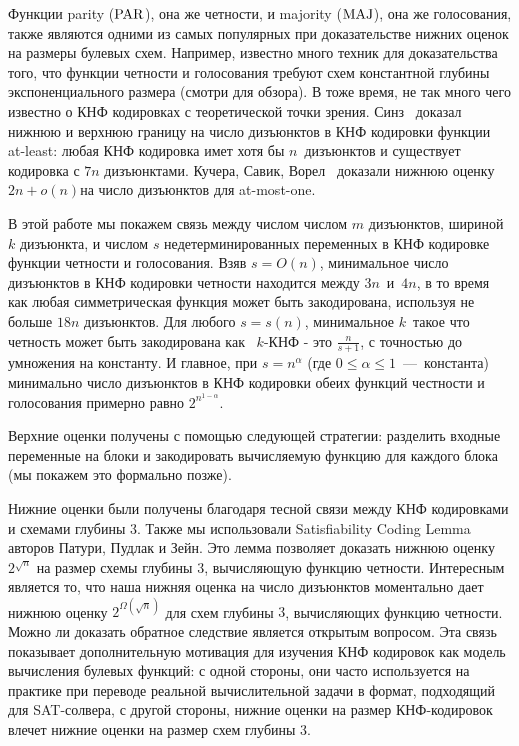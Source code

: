 Функции parity ($\operatorname{PAR}$), она же четности, и majority ($\operatorname{MAJ}$), она же голосования, также являются одними из самых популярных при доказательстве нижних оценок на размеры булевых схем. Например, известно много техник для доказательства того, что функции четности и голосования требуют схем константной глубины экспоненциального размера (смотри \cite[главы~11 и~12]{DBLP:books/daglib/0028687} для обзора). В тоже время, не так много чего известно о КНФ кодировках с теоретической точки зрения. Синз~\cite{DBLP:conf/cp/Sinz05} доказал нижнюю и верхнюю границу на число дизъюнктов в КНФ кодировки функции at-least:
любая КНФ кодировка имет хотя бы $n$~дизъюнктов и существует кодировка с $7n$ дизъюнктами.
Кучера, Савик, Ворел~\cite{DBLP:journals/tcs/KuceraSV19} 
доказали нижнюю оценку $2n + o(n)$на число дизъюнктов для at-most-one.

В этой работе мы покажем связь между числом числом $m$ дизъюнктов, шириной $k$ дизъюнкта, и числом $s$ недетерминированных переменных в КНФ кодировке функции четности и голосования.
Взяв $s=O(n)$, минимальное число дизъюнктов в КНФ кодировки четности находится между $3n$~и~$4n$, в то время как любая симметрическая функция может быть закодирована, используя не больше $18n$ дизъюнктов.
Для любого $s=s(n)$, минимальное $k$~такое что четность может быть закодирована как ~$k$-КНФ - это $\frac{n}{s+1}$, с точностью до умножения на константу. 
И главное, при $s=n^{\alpha}$
(где $0 \le \alpha \le 1$~---~константа)
минимально число дизъюнктов в КНФ кодировки обеих функций честности и голосования примерно равно $2^{n^{1-\alpha}}$.

Верхние оценки получены с помощью следующей стратегии: разделить входные переменные на блоки и закодировать вычисляемую функцию для каждого блока (мы покажем это формально позже).

Нижние оценки были получены благодаря тесной связи между КНФ кодировками и схемами глубины $3$. Также мы использовали Satisfiability Coding Lemma авторов Патури, Пудлак и Зейн\cite{DBLP:journals/cjtcs/PaturiPZ99}.
Это лемма позволяет доказать нижнюю оценку $2^{\sqrt n}$ на размер схемы глубины $3$, вычисляющую функцию четности. Интересным является то, что наша нижняя оценка на число дизъюнктов моментально дает нижнюю оценку $2^{\Omega(\sqrt n)}$ для схем глубины $3$, вычисляющих функцию четности. Можно ли доказать обратное следствие является открытым вопросом. Эта связь показывает дополнительную мотивация для изучения КНФ кодировок как модель вычисления булевых функций: с одной стороны,
они часто используется на практике при переводе
реальной вычислительной задачи в формат, подходящий
для SAT-солвера, с другой стороны, нижние оценки на размер КНФ-кодировок влечет нижние оценки на размер схем глубины 3.
